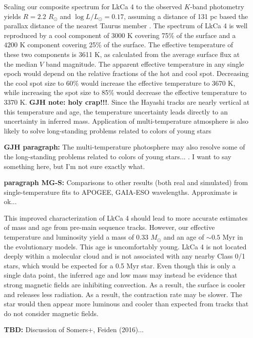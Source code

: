 \documentclass[twocolumn]{emulateapj}%
\begin{document}
Scaling our composite spectrum for LkCa 4 to the observed $K$-band photometry yields $R=2.2$ $R_\odot$ and $\log L/L_\odot=0.17$, assuming a distance of 131 pc based the parallax distance of the nearest Taurus member \citep{torres12}.   The spectrum of LkCa 4 is well reproduced by a cool component of $3000$ K covering 75\% of the surface and a $4200$ K component covering 25\% of the surface.  The effective temperature of these two components is 3611 K, as calculated from the average surface flux at the median $V$ band magnitude.  The apparent effective temperature in any single epoch would depend on the relative fractions of the hot and cool spot.  Decreasing the cool spot size to 60\% would increase the effective temperature to 3670 K, while increasing the spot size to 85\% would decrease the effective temperature to 3370 K.  {\bf GJH note:  holy crap!!!}.  Since the Hayashi tracks are nearly vertical at this temperature and age, the temperature uncertainty leads directly to an uncertainty in inferred mass.  Application of multi-temperature atmosphere is also likely to solve long-standing problems related to colors of young stars \citep[e.g.][]{stauffer03}

{\bf GJH paragraph:}  The multi-temperature photosphere may also resolve some of the long-standing problems related to colors of young stars...  \citet{tottle15}.  I want to say something here, but I'm not sure exactly what.


{\bf paragraph MG-S:}  Comparisons to other results (both real and simulated) from single-temperature fits to APOGEE, GAIA-ESO wavelengths.  Approximate is ok...


This improved characterization of LkCa 4 should lead to more accurate estimates of mass and age from pre-main sequence tracks.  However, our effective temperature and luminosity yield a mass of 0.33 $M_\odot$ and an age of $\sim 0.5$ Myr in the \citet{baraffe15} evolutionary models.  This age is uncomfortably young.  LkCa 4 is not located deeply within a molecular cloud and is not associated with any nearby Class 0/1 stars, which would be expected for a 0.5 Myr star.  Even though this is only a single data point, the inferred age and low mass may instead be evidence that strong magnetic fields are inhibiting convection.  As a result, the surface is cooler and releases less radiation.  As a result, the contraction rate may be slower.  The star would then appear more luminous and cooler than expected from tracks that do not consider magnetic fields.

{\bf TBD:}  Discussion of Somers+, Feiden (2016)...
\end{document}
